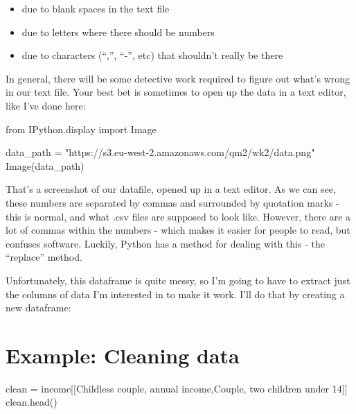 \documentclass[
  letterpaper,
  DIV=11,
  numbers=noendperiod]{scrreprt}
\newenvironment{Shaded}{\begin{snugshade}}{\end{snugshade}}
\newcommand{\ImportTok}[1]{\textcolor[rgb]{0.00,0.46,0.62}{#1}}
\newcommand{\NormalTok}[1]{\textcolor[rgb]{0.00,0.23,0.31}{#1}}
\newcommand{\OperatorTok}[1]{\textcolor[rgb]{0.37,0.37,0.37}{#1}}
\newcommand{\StringTok}[1]{\textcolor[rgb]{0.13,0.47,0.30}{#1}}
\begin{document}
\begin{itemize}
\item
  due to blank spaces in the text file
\item
  due to letters where there should be numbers
\item
  due to characters (``,'', ``-'', etc) that shouldn't really be there
\end{itemize}

In general, there will be some detective work required to figure out
what's wrong in our text file. Your best bet is sometimes to open up the
data in a text editor, like I've done here:

\begin{Shaded}
\begin{Highlighting}[]
\ImportTok{from}\NormalTok{ IPython.display }\ImportTok{import}\NormalTok{ Image}

\NormalTok{data\_path }\OperatorTok{=} \StringTok{"https://s3.eu{-}west{-}2.amazonaws.com/qm2/wk2/data.png"}
\NormalTok{Image(data\_path)}
\end{Highlighting}
\end{Shaded}

That's a screenshot of our datafile, opened up in a text editor. As we
can see, these numbers are separated by commas and surrounded by
quotation marks - this is normal, and what .csv files are supposed to
look like. However, there are a lot of commas within the numbers - which
makes it easier for people to read, but confuses software. Luckily,
Python has a method for dealing with this - the ``replace'' method.

Unfortunately, this dataframe is quite messy, so I'm going to have to
extract just the columns of data I'm interested in to make it work. I'll
do that by creating a new dataframe:

\hypertarget{example-cleaning-data}{%
\section{Example: Cleaning data}\label{example-cleaning-data}}

\begin{Shaded}
\begin{Highlighting}[]
\NormalTok{clean }\OperatorTok{=}\NormalTok{ income[[}\StringTok{\textquotesingle{}Childless couple, annual income\textquotesingle{}}\NormalTok{,}\StringTok{\textquotesingle{}Couple, two children under 14\textquotesingle{}}\NormalTok{]]}
\NormalTok{clean.head()}
\end{Highlighting}
\end{Shaded}
\end{document}
